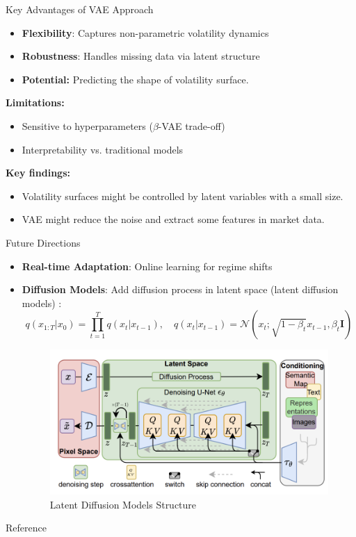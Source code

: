 \documentclass{beamer}
\begin{document}
\begin{frame}{Key Advantages of VAE Approach}
\begin{itemize}
    \item \textbf{Flexibility}: Captures non-parametric volatility dynamics
    
    \item \textbf{Robustness}: Handles missing data via latent structure

    \item \textbf{Potential:} Predicting the shape of volatility surface.
\end{itemize}
\vspace{0.5cm}
\textbf{Limitations:}
\begin{itemize}
    \item Sensitive to hyperparameters (\(\beta\)-VAE trade-off)
    \item Interpretability vs. traditional models
\end{itemize}
\textbf{Key findings:}
\begin{itemize}
    \item Volatility surfaces might be controlled by latent variables with a small size.
    \item VAE might reduce the noise and extract some features in market data.
\end{itemize}
\end{frame}

\begin{frame}{Future Directions}
\begin{itemize}
\item \textbf{Real-time Adaptation}: Online learning for regime shifts
    \item \textbf{Diffusion Models}: Add diffusion process in latent space (latent diffusion models) :
    \[
    q(x_{1:T}|x_0) = \prod_{t=1}^T q(x_t|x_{t-1}), \quad q(x_t|x_{t-1}) = \mathcal{N}(x_t; \sqrt{1-\beta_t}x_{t-1}, \beta_t \mathbf{I})
    \]
\begin{figure}
    \centering
    \includegraphics[width=0.6\linewidth]{docs/proposal/img/ldm.png}
    \caption{Latent Diffusion Models Structure}
    \label{fig:enter-label}
\end{figure}
\end{itemize}



\end{frame}

\begin{frame}{Reference}
    
    
\end{frame}
\end{document}
